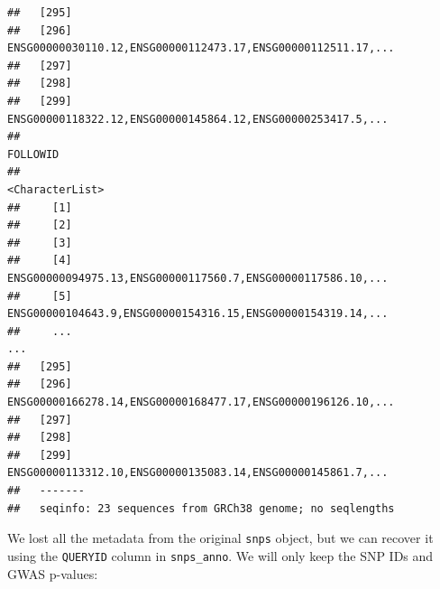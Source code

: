 \documentclass[9pt,a4paper,]{extarticle}
\newenvironment{Shaded}{\begin{snugshade}}{\end{snugshade}}
\newcommand{\KeywordTok}[1]{\textcolor[rgb]{0.13,0.29,0.53}{\textbf{#1}}}
\newcommand{\StringTok}[1]{\textcolor[rgb]{0.31,0.60,0.02}{#1}}
\newcommand{\OperatorTok}[1]{\textcolor[rgb]{0.81,0.36,0.00}{\textbf{#1}}}
\newcommand{\NormalTok}[1]{#1}
\begin{document}
\begin{verbatim}
##   [295]                                                             
##   [296] ENSG00000030110.12,ENSG00000112473.17,ENSG00000112511.17,...
##   [297]                                                             
##   [298]                                                             
##   [299]  ENSG00000118322.12,ENSG00000145864.12,ENSG00000253417.5,...
##                                                             FOLLOWID
##                                                      <CharacterList>
##     [1]                                                             
##     [2]                                                             
##     [3]                                                             
##     [4]  ENSG00000094975.13,ENSG00000117560.7,ENSG00000117586.10,...
##     [5]  ENSG00000104643.9,ENSG00000154316.15,ENSG00000154319.14,...
##     ...                                                          ...
##   [295]                                                             
##   [296] ENSG00000166278.14,ENSG00000168477.17,ENSG00000196126.10,...
##   [297]                                                             
##   [298]                                                             
##   [299]  ENSG00000113312.10,ENSG00000135083.14,ENSG00000145861.7,...
##   -------
##   seqinfo: 23 sequences from GRCh38 genome; no seqlengths
\end{verbatim}

We lost all the metadata from the original \texttt{snps} object, but we can recover it using the \texttt{QUERYID} column in \texttt{snps\_anno}.
We will only keep the SNP IDs and GWAS p-values:

\begin{Shaded}
\end{Shaded}
\end{document}
